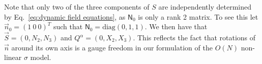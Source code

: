 Note that only two of the three components of $S$ are independently determined by Eq.~\ref{eq:dynamic field equations}, as $\mathsf{N}_0$ is only a rank 2 matrix. To see this let $\vec{n}_0 = (1\ 0\ 0)^T$ such that $\mathsf{N}_0 = \text{diag}(0,1,1)$. We then have that $\vec{S} = (0, N_2, N_3)$ and $Q^\alpha = (0, X_2, X_3)$. This reflects the fact that rotations of $\vec{n}$ around its own axis is a gauge freedom in our formulation of the $O(N)$ non-linear $\sigma$ model.

